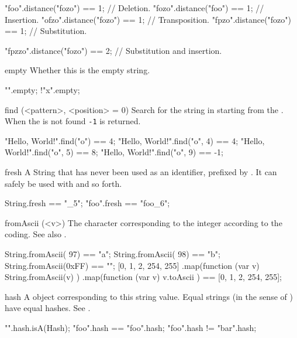 \begin{urbiscriptapi}
\begin{urbiassert}
  "foo".distance("fozo") == 1; // Deletion.
 "fozo".distance("foo")  == 1; // Insertion.
 "ofzo".distance("fozo") == 1; // Transposition.
 "fpzo".distance("fozo") == 1; // Substitution.

"fpzzo".distance("fozo") == 2; // Substitution and insertion.
\end{urbiassert}


\item[empty] Whether this is the empty string.
\begin{urbiassert}
  "".empty;
!"x".empty;
\end{urbiassert}


\item[find](<pattern>, <position> = 0)%
  Search for the  string in \this starting from the
  .  When the  is not found \lstinline|-1| is
  returned.
\begin{urbiassert}
"Hello, World!".find("o")    == 4;
"Hello, World!".find("o", 4) == 4;
"Hello, World!".find("o", 5) == 8;
"Hello, World!".find("o", 9) == -1;
\end{urbiassert}


\item[fresh] A String that has never been used as an identifier, prefixed by
  \this.  It can safely be used with  and so forth.
\begin{urbiassert}
String.fresh == "_5";
"foo".fresh == "foo_6";
\end{urbiassert}


\item[fromAscii](<v>) The character corresponding to the integer 
  according to the  coding.  See also .
\begin{urbiassert}
String.fromAscii(  97) == "a";
String.fromAscii(  98) == "b";
String.fromAscii(0xFF) == "\xff";
[0, 1, 2, 254, 255]
  .map(function (var v) { String.fromAscii(v) })
  .map(function (var v) { v.toAscii })
  == [0, 1, 2, 254, 255];
\end{urbiassert}


\item[hash]%
  A  object corresponding to this string value.  Equal
  strings (in the sense of ) have equal hashes.  See
  .

\begin{urbiassert}
"".hash.isA(Hash);
"foo".hash == "foo".hash;
"foo".hash != "bar".hash;
\end{urbiassert}



\end{urbiscriptapi}
